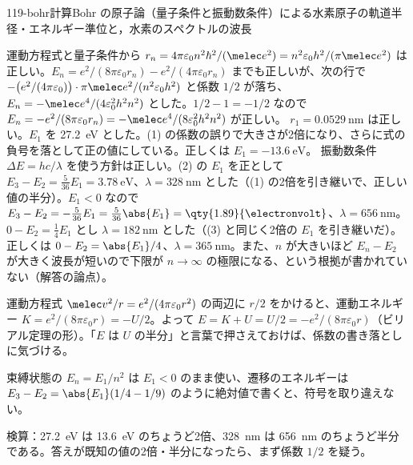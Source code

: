 \documentclass[uplatex,dvipdfmx,a4paper,11pt]{jsarticle}
\begin{document}
\begin{mondai}{119-bohr}{計算}{Bohr の原子論（量子条件と振動数条件）による水素原子の軌道半径・エネルギー準位と，水素のスペクトルの波長}
\begin{kotaeran}
   運動方程式と量子条件から $r_{n}=4\pi\varepsilon_{0}n^{2}\hbar^{2}/(\melec e^{2})=n^{2}\varepsilon_{0}h^{2}/(\pi\melec e^{2})$ は正しい。$E_{n}=e^{2}/(8\pi\varepsilon_{0}r_{n})-e^{2}/(4\pi\varepsilon_{0}r_{n})$ までも正しいが、次の行で $-\bigl(e^{2}/(4\pi\varepsilon_{0})\bigr)\cdot\pi\melec e^{2}/(n^{2}\varepsilon_{0}h^{2})$ と係数 $1/2$ が落ち、$E_{n}=-\melec e^{4}/(4\varepsilon_{0}^{2}h^{2}n^{2})$ とした。$1/2-1=-1/2$ なので $E_{n}=-e^{2}/(8\pi\varepsilon_{0}r_{n})=-\melec e^{4}/(8\varepsilon_{0}^{2}h^{2}n^{2})$ が正しい。
   $r_{1}=\qty{0.0529}{\nano\metre}$ は正しい。$E_{1}$ を \qty{27.2}{\electronvolt} とした。(1) の係数の誤りで大きさが2倍になり、さらに式の負号を落として正の値にしている。正しくは $E_{1}=\qty{-13.6}{\electronvolt}$。
   振動数条件 $\Delta E=hc/\lambda$ を使う方針は正しい。(2) の $E_{1}$ を正として $E_{3}-E_{2}=\frac{5}{36}E_{1}=\qty{3.78}{\electronvolt}$、$\lambda=\qty{328}{\nano\metre}$ とした（(1) の2倍を引き継いで、正しい値の半分）。$E_{1}<0$ なので $E_{3}-E_{2}=-\frac{5}{36}E_{1}=\frac{5}{36}\abs{E_{1}}=\qty{1.89}{\electronvolt}$、$\lambda=\qty{656}{\nano\metre}$。
   $0-E_{2}=\frac{1}{4}E_{1}$ とし $\lambda=\qty{182}{\nano\metre}$ とした（(3) と同じく2倍の $E_{1}$ を引き継いだ）。正しくは $0-E_{2}=\abs{E_{1}}/4$、$\lambda=\qty{365}{\nano\metre}$。また、$n$ が大きいほど $E_{n}-E_{2}$ が大きく波長が短いので下限が $n\to\infty$ の極限になる、という根拠が書かれていない（解答の論点）。
\end{kotaeran}
\begin{rikai}
  \item 運動方程式 $\melec v^{2}/r=e^{2}/(4\pi\varepsilon_{0}r^{2})$ の両辺に $r/2$ をかけると、運動エネルギー $K=e^{2}/(8\pi\varepsilon_{0}r)=-U/2$。よって $E=K+U=U/2=-e^{2}/(8\pi\varepsilon_{0}r)$（ビリアル定理の形）。「$E$ は $U$ の半分」と言葉で押さえておけば、係数の書き落としに気づける。
  \item 束縛状態の $E_{n}=E_{1}/n^{2}$ は $E_{1}<0$ のまま使い、遷移のエネルギーは $E_{3}-E_{2}=\abs{E_{1}}(1/4-1/9)$ のように絶対値で書くと、符号を取り違えない。
  \item 検算：\qty{27.2}{\electronvolt} は \qty{13.6}{\electronvolt} のちょうど2倍、\qty{328}{\nano\metre} は \qty{656}{\nano\metre} のちょうど半分である。答えが既知の値の2倍・半分になったら、まず係数 $1/2$ を疑う。
\end{rikai}
\end{mondai}
\end{document}
